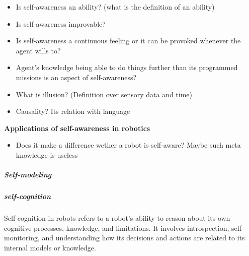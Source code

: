 \documentclass{book}
\providecommand{\ProjectDeepHeading}[2]{%
    \par\medskip\noindent\textbf{#2}\par\smallskip
}
\begin{document}
\begin{itemize}
    \item Is self-awareness an ability? (what is the definition of an ability)
    \item Is self-awareness improvable?
    \item Is self-awareness a continuous feeling or it can be provoked whenever the agent wills to?
    \item Agent's knowledge being able to do things further than its programmed missions is an aspect of self-awareness?
    \item What is illusion? (Definition over sensory data and time)
    \item Causality? Its relation with language
\end{itemize}

\ProjectDeepHeading{1}{Applications of self-awareness in robotics}
\begin{itemize}
    \item Does it make a difference wether a robot is self-aware? Maybe such meta knowledge is useless
\end{itemize}


\subparagraph{Self-modeling}


\subparagraph{self-cognition}
Self-cognition in robots refers to a robot's ability to reason about its own cognitive processes, knowledge, and limitations. It involves introspection, self-monitoring, and understanding how its decisions and actions are related to its internal models or knowledge.
\end{document}
